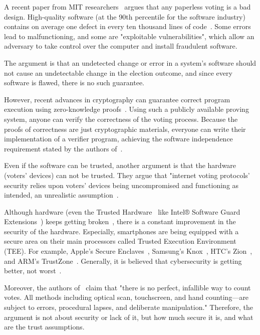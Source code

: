 \documentclass{article}
\begin{document}
A recent paper from MIT researchers~\cite{parkGoingBadWorse2021} argues that any paperless voting is a bad design. High-quality software (at the 90th percentile for the software industry) contains on average one defect in every ten thousand lines of code~\cite{llaguno2017CoverityScan2017}. Some errors lead to malfunctioning, and some are "exploitable vulnerabilities", which allow an adversary to take control over the computer and install fraudulent software.

The argument is that an undetected change or error in a system's software should not cause an undetectable change in the election outcome, and since every software is flawed, there is no such guarantee.

However, recent advances in cryptography can guarantee correct program execution using zero-knowledge proofs~\cite{parnoPinocchioNearlyPractical2013}. Using such a publicly available proving system, anyone can verify the correctness of the voting process. Because the proofs of correctness are just cryptographic materials, everyone can write their implementation of a verifier program, achieving the software independence requirement stated by the authors of~\cite{parkGoingBadWorse2021}.

Even if the software can be trusted, another argument is that the hardware (voters' devices) can not be trusted. They argue that "internet voting protocols' security relies upon voters' devices being uncompromised and functioning as intended, an unrealistic assumption~\cite{parkGoingBadWorse2021}.

Although hardware (even the Trusted Hardware~\cite{sionTrustedHardware2009} like Intel® Software Guard Extensions~\cite{mckeenIntelSoftwareGuard2016}) keeps getting broken~\cite{goodinIntelSGXVulnerable2020, IntelSGXBroken2019, bulckForeshadowExtractingKeys}, there is a constant improvement in the security of the hardware. Especially, smartphones are being equipped with a secure area on their main processors called Trusted Execution Environment (TEE). For example, Apple's Secure Enclaves~\cite{SecureEnclave}, Samsung's Knox~\cite{kanonovSecureContainersAndroid2016}, HTC's Zion~\cite{exodusZION}, and ARM's TrustZone~\cite{ARMSecurityTechnology}. Generally, it is believed that cybersecurity is getting better, not worst~\cite{golombBelieveItCybersecurity2018}.

Moreover, the authors of~\cite{appelEvidenceBasedElectionsCreate2019} claim that "there is no perfect, infallible way to count votes. All methods including optical scan, touchscreen, and hand counting—are subject to errors, procedural lapses, and deliberate manipulation." Therefore, the argument is not about security or lack of it, but how much secure it is, and what are the trust assumptions.
\end{document}

